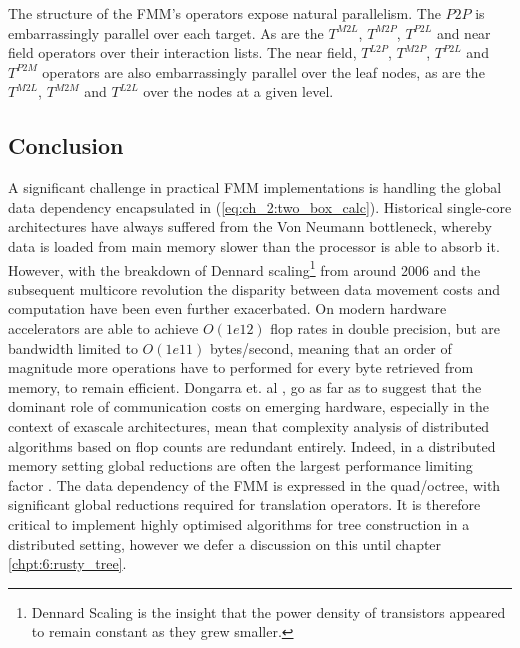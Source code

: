 The structure of the FMM's operators expose natural parallelism. The $P2P$ is embarrassingly parallel over each target. As are the $T^{M2L}$, $T^{M2P}$, $T^{P2L}$ and near field operators over their interaction lists. The near field, $T^{L2P}$, $T^{M2P}$, $T^{P2L}$ and $T^{P2M}$ operators are also embarrassingly parallel over the leaf nodes, as are the $T^{M2L}$, $T^{M2M}$ and $T^{L2L}$ over the nodes at a given level.

\subsection*{Conclusion}

A significant challenge in practical FMM implementations is handling the global data dependency encapsulated in (\ref{eq:ch_2:two_box_calc}). Historical single-core architectures have always suffered from the Von Neumann bottleneck, whereby data is loaded from main memory slower than the processor is able to absorb it. However, with the breakdown of Dennard scaling\footnote{Dennard Scaling is the insight that the power density of transistors appeared to remain constant as they grew smaller.} from around 2006 and the subsequent multicore revolution the disparity between data movement costs and computation have been even further exacerbated. On modern hardware accelerators are able to achieve $O(1e12)$ flop rates in double precision, but are bandwidth limited to $O(1e11)$ bytes/second, meaning that an order of magnitude more operations have to performed for every byte retrieved from memory, to remain efficient. Dongarra et. al \cite{dongarra2017extreme}, go as far as to suggest that the dominant role of communication costs on emerging hardware, especially in the context of exascale architectures, mean that complexity analysis of distributed algorithms based on flop counts are redundant entirely. Indeed, in a distributed memory setting global reductions are often the largest performance limiting factor \cite{dongarra2017extreme}. The data dependency of the FMM is expressed in the quad/octree, with significant global reductions required for translation operators. It is therefore critical to implement highly optimised algorithms for tree construction in a distributed setting, however we defer a discussion on this until chapter \ref{chpt:6:rusty_tree}.

